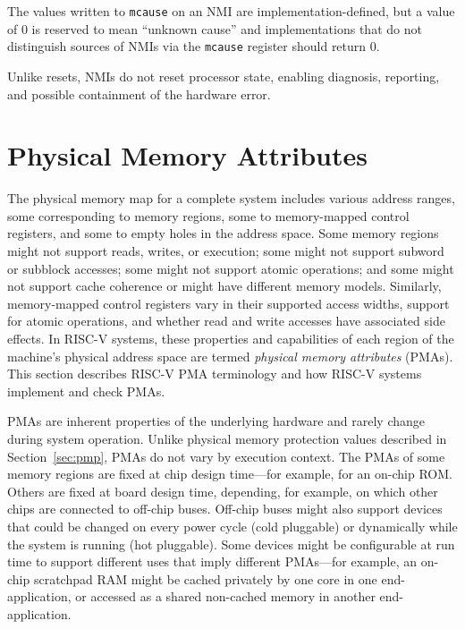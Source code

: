 The values written to {\tt mcause} on an NMI are
implementation-defined, but a value of 0 is reserved to mean ``unknown
cause'' and implementations that do not distinguish sources of NMIs
via the {\tt mcause} register should return 0.

Unlike resets, NMIs do not reset processor state, enabling diagnosis,
reporting, and possible containment of the hardware error.

\section{Physical Memory Attributes}
\label{sec:pma}

The physical memory map for a complete system includes various address
ranges, some corresponding to memory regions, some to memory-mapped
control registers, and some to empty holes in the address space.  Some
memory regions might not support reads, writes, or execution; some
might not support subword or subblock accesses; some might not support
atomic operations; and some might not support cache coherence or might
have different memory models.  Similarly, memory-mapped control
registers vary in their supported access widths, support for atomic
operations, and whether read and write accesses have associated side
effects.  In RISC-V systems, these properties and capabilities of each
region of the machine's physical address space are termed {\em
  physical memory attributes} (PMAs).  This section describes RISC-V
PMA terminology and how RISC-V systems implement and check PMAs.

PMAs are inherent properties of the underlying hardware and rarely
change during system operation.  Unlike physical memory protection
values described in Section~\ref{sec:pmp}, PMAs do not vary by
execution context.  The PMAs of some memory regions are fixed at chip
design time---for example, for an on-chip ROM.  Others are fixed at
board design time, depending, for example, on which other chips are
connected to off-chip buses.  Off-chip buses might also support
devices that could be changed on every power cycle (cold pluggable) or
dynamically while the system is running (hot pluggable).  Some devices
might be configurable at run time to support different uses that imply
different PMAs---for example, an on-chip scratchpad RAM might be
cached privately by one core in one end-application, or accessed as a
shared non-cached memory in another end-application.

